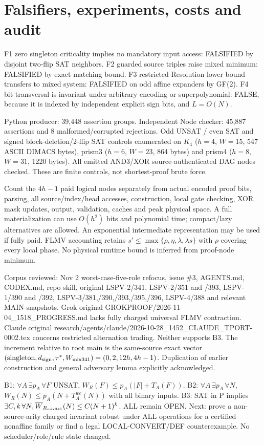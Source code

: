 \documentclass[11pt]{article}
\begin{document}
\section*{Falsifiers, experiments, costs and audit}
F1 zero singleton criticality implies no mandatory input access: FALSIFIED by disjoint two-flip SAT neighbors. F2 guarded source triples raise mixed minimum: FALSIFIED by exact matching bound. F3 restricted Resolution lower bound transfers to mixed system: FALSIFIED on odd affine expanders by GF(2). F4 bit-transversal is invariant under arbitrary encoding or superpolynomial: FALSE, because it is indexed by independent explicit sign bits, and $L=O(N)$.
\par Python producer: 39,448 assertion groups. Independent Node checker: 45,887 assertions and 8 malformed/corrupted rejections. Odd UNSAT / even SAT and signed block-deletion/2-flip SAT controls enumerated on $K_4$ ($h=4$, $W=15$, 547 ASCII DIMACS bytes), prism3 ($h=6$, $W=23$, 864 bytes) and prism4 ($h=8$, $W=31$, 1220 bytes). All emitted AND3/XOR source-authenticated DAG nodes checked. These are finite controls, not shortest-proof brute force.
\par Count the $4h-1$ paid logical nodes separately from actual encoded proof bits, parsing, all source/index/head accesses, construction, local gate checking, XOR mask updates, output, validation, caches and peak physical space. A full materialization can use $O(h^2)$ bits and polynomial time; compact/lazy alternatives are allowed. An exponential intermediate representation may be used if fully paid. FLMV accounting retains $s'\le\max\{\rho,\eta,\lambda,\lambda s\}$ with $\rho$ covering every local phase. No physical runtime bound is inferred from proof-node minimum.
\par Corpus reviewed: Nov 2 worst-case-five-role refocus, issue \#3, AGENTS.md, CODEX.md, repo skill, original LSPV-2/341, LSPV-2/351 and /393, LSPV-1/390 and /392, LSPV-3/381,/390,/393,/395,/396, LSPV-4/388 and relevant MAIN snapshots. Grok original GROKPROOF/2026-11-04\_1518\_PROGRESS.md lacks fully charged universal FLMV contraction. Claude original research/agents/claude/2026-10-28\_1452\_CLAUDE\_TPORT-0002.tex concerns restricted alternation trading. Neither supports B3. The increment relative to root main is the same-source exact vector $(\text{singleton},d_{\rm sign},\tau^*,W_{\rm mix341})=(0,2,12h,4h-1)$. Duplication of earlier construction and general adversary lemma explicitly acknowledged.
\par B1: $\forall A\,\exists p_A\,\forall F$ UNSAT, $W_R(F)\le p_A(|F|+T_A(F))$. B2: $\forall A\,\exists p_A\,\forall N$, $\overline W_R(N)\le p_A(N+T_A^{wc}(N))$ with all binary inputs. B3: SAT in P implies $\exists C,k\,\forall N,\overline W_{R_{\rm mix341}}(N)\le C(N+1)^k$. ALL remain OPEN. Next: prove a non-source-arity charged invariant robust under ALL operations for a certified nonaffine family or find a legal LOCAL-CONVERT/DEF counterexample. No scheduler/role/rule state changed.
\end{document}
